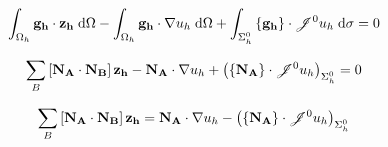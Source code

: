 \documentclass[11pt,a4paper]{article}
\begin{document}
\begin{dmath}
  \int_{\Omega_h} {\bf g_h} \cdot {\bf z_h} \; \text{d}\Omega - \int_{\Omega_h} {\bf g_h} \cdot \nabla u_h \; \text{d}\Omega + \int_{\Sigma^0_h} \left\{ {\bf g_h} \right\} \cdot \mathscr{J}^0 u_h \; \text{d}\sigma = 0
\end{dmath}

\begin{dmath}
  \sum_B \left[ {\bf N_A} \cdot {\bf N_B} \right] {\bf z_h} - {\bf N_A} \cdot \nabla u_h + \left( \left\{ {\bf N_A} \right\} \cdot \mathscr{J}^0 u_h \right)_{\Sigma^0_h} = 0
\end{dmath}

\begin{dmath}
  \sum_B \left[ {\bf N_A} \cdot {\bf N_B} \right] {\bf z_h} = {\bf N_A} \cdot \nabla u_h - \left( \left\{ {\bf N_A} \right\} \cdot \mathscr{J}^0 u_h \right)_{\Sigma^0_h}
\end{dmath}



\end{document}
